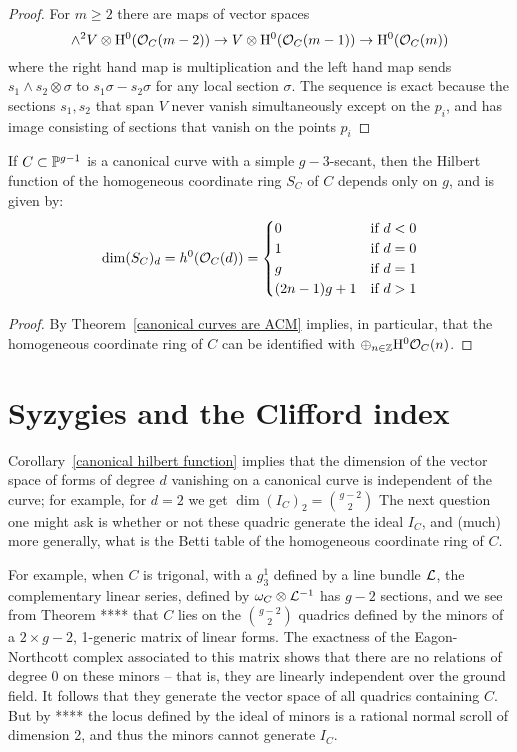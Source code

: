 \begin{proof}
For $m\geq 2$ there are maps of vector spaces
$$
\wedge^{2} V\otimes {\rm{H}}^{0}({\mathcal O}_{C}(m-2)) \to V\otimes {\rm{H}}^{0}({\mathcal O}_{C}(m-1)) 
\to {\rm{H}}^{0}({\mathcal O}_{C}(m))
$$
where the right hand map is multiplication and the left hand map sends
$s_{1}\wedge s_{2}\otimes \sigma$ to $s_{1}\sigma-s_{2}\sigma$ for any local section $\sigma$.
The sequence is exact because the sections $s_{1},s_{2}$ that span $V$ never vanish simultaneously except on the $p_{i}$, and has image  consisting of sections that vanish on the points $p_{i}$

\end{proof}

\begin{corollary}\label{canonical hilbert function}
If $C\subset {\mathbb P}^{g-1}$ is a canonical curve with a simple $g-3$-secant, then the Hilbert function of the homogeneous coordinate ring $S_{C}$ of  $C$ depends only on $g$, and is given by:
$$
\dim({S_{C}})_{d} = h^{0}({\mathcal O}_{C}(d)) = 
\begin{cases}
 0 &\mbox {if } d<0\\
 1 & \mbox {if }  d=0\\
 g & \mbox {if }  d=1\\
 (2n-1)g+1 & \mbox {if }  d>1\\
\end{cases}
$$
\end{corollary}
\begin{proof}
By Theorem~\ref{canonical curves are ACM} implies, in particular, that the homogeneous coordinate ring of $C$ can be identified with $\oplus_{n\in {\mathbb Z}}{\rm{H}}^0{\mathcal O}_C(n)$.  
\end{proof}

\section{Syzygies and the Clifford index}

Corollary~\ref{canonical hilbert function} implies that the dimension of the vector space of forms of degree $d$
vanishing on a canonical curve is independent of the curve; for example, for $d=2$ we get
$
\dim ({I_{C}})_{2} = {g-2\choose 2}
$
The next question one might ask is whether or not these quadric generate the ideal $I_{C}$, and (much) more generally, what is the 
Betti table of the homogeneous coordinate ring of $C$.

 For example,
when $C$ is trigonal, with a $g^{1}_{3}$ defined by a line bundle ${\mathcal L}$, the complementary linear series,
defined by $\omega_{C}\otimes {\mathcal L}^{-1}$ has $g-2$ sections, and we see from Theorem ****
that $C$ lies on the ${g-2\choose 2}$ quadrics defined by the minors of a $2\times g-2$, 1-generic matrix of linear forms. The exactness of the Eagon-Northcott complex associated to this matrix shows that there are no relations of degree 0 on these minors -- that is, they are linearly independent over the ground field. It follows that they generate the vector space of all quadrics containing $C$. But by **** the locus defined by
the ideal of minors is a rational normal scroll of dimension 2, and thus the minors cannot generate $I_{C}$.


